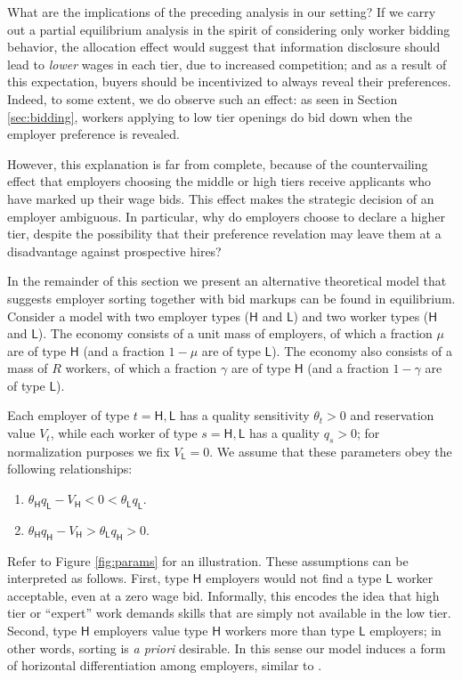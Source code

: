 \documentclass[prodmode,acmec]{ec-acmsmall}
\renewcommand{\H}{\ensuremath{\mathsf{H}}}
\renewcommand{\L}{\ensuremath{\mathsf{L}}}
\begin{document}
What are the implications of the preceding analysis in our setting?  
If we carry out a partial equilibrium analysis in the spirit of \cite{tadelis2011information} considering only worker bidding behavior,
the allocation effect would suggest that information disclosure should lead to {\em lower} wages in each tier, due to increased competition; 
and as a result of this expectation, buyers should be incentivized to always reveal their preferences.
Indeed, to some extent, we do observe such an effect:
as seen in Section \ref{sec:bidding}, workers applying to low tier openings do bid down when the employer preference is revealed.

However, this explanation is far from complete, because of the countervailing effect that employers choosing the middle or high tiers receive applicants who have marked up their wage bids.
This effect makes the strategic decision of an employer ambiguous.
In particular, why do employers choose to declare a higher tier, despite the possibility that their preference revelation may leave them at a disadvantage against prospective hires?

In the remainder of this section we present an alternative theoretical model that suggests employer sorting together with bid markups can be found in equilibrium.  
Consider a model with two employer types ($\H$ and $\L$) and two worker types ($\H$ and $\L$).
The economy consists of a unit mass of employers, of which a fraction $\mu$ are of type $\H$ (and a fraction $1-\mu$ are of type $\L$).
The economy also consists of a mass of $R$ workers, of which a fraction $\gamma$ are of type $\H$ (and a fraction $1-\gamma$ are of type $\L$).  

Each employer of type $t =\H, \L$ has a quality sensitivity $\theta_t > 0$ and reservation value $V_t$, while each worker of type $s = \H, \L$ has a quality $q_s > 0$; for normalization purposes we fix $V_\L  = 0$.  We assume that these parameters obey the following relationships: 
\begin{enumerate}
\item $\theta_\H q_\L - V_\H < 0 < \theta_\L q_\L$.
\item $\theta_\H q_\H - V_\H > \theta_\L q_\H > 0$.
\end{enumerate}
Refer to Figure \ref{fig:params} for an illustration.
These assumptions can be interpreted as follows.
First, type $\H$ employers would not find a type $\L$ worker acceptable, even at a zero wage bid.
Informally, this encodes the idea that high tier or ``expert'' work demands skills that are simply not available in the low tier.
Second, type $\H$ employers value type $\H$ workers more than type $\L$ employers; in other words, sorting is {\em a priori} desirable.  In this sense our model induces a form of horizontal differentiation among employers, similar to \cite{tadelis2011information}.
\end{document}
